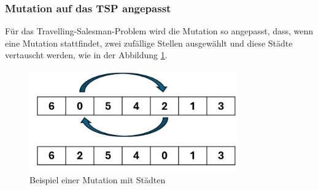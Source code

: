 \subsubsection{Mutation auf das TSP angepasst
\label{buch:paper:varalg:subsection:mutation_tsp}}
Für das Travelling-Salesman-Problem wird die Mutation so angepasst,
dass, wenn eine Mutation stattfindet, zwei zufällige Stellen ausgewählt
und diese Städte vertauscht werden, 
wie in der Abbildung \ref{fig:mutation_genetic_string_cities}.
\begin{figure}
	\centering
	\includegraphics[width=0.8\textwidth]{
        papers/varalg/images/teil3/09GeneticStringCitiesMutation.png
        }
	\caption{Beispiel einer Mutation mit Städten}
	\label{fig:mutation_genetic_string_cities}
\end{figure}
